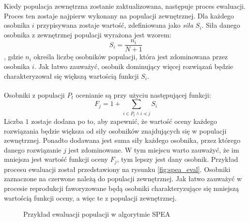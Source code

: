 \documentclass[twoside]{iisthesis}
\begin{document}
Kiedy populacja zewnętrzna zostanie zaktualizowana, następuje proces ewaluacji. Proces ten zostaje najpierw wykonany na populacji zewnętrznej. Dla każdego osobnika $i$ przypisywana zostaje wartość, zdefiniowana jako \textit{siła} $S_{i}$. Siła danego osobnika z zewnętrznej populacji wyrażona jest wzorem:
\begin{equation}\label{eq:str_ep}
	S_{i} = \dfrac{n_{i}}{N + 1}
\end{equation}
, gdzie $n_{i}$ określa liczbę osobników populacji, która jest zdominowana przez osobnika $i$. Jak łatwo zauważyć, osobnik dominujący więcej rozwiązań będzie charakteryzował się większą wartością funkcji $S_{i}$.\\\\
Osobniki z populacji $P_{t}$ ocenianie są przy użyciu następującej funkcji:
\begin{equation}\label{eq:str_p}
	F_{j} = 1 + \sum_{i \in \overline{P_{t}} \wedge i \preceq j} S_{i}
\end{equation}
Liczba $1$ zostaje dodana po to, aby zapewnić, że wartość oceny każdego rozwiązania będzie większa od siły osobników znajdujących się w populacji zewnętrznej. Ponadto dodawana jest suma siły każdego osobnika, przez którego danego rozwiązanie $j$ jest zdominowane. W tym miejscu warto zauważyć, że im mniejsza jest wartość funkcji oceny $F_{j}$, tym lepszy jest dany osobnik. Przykład procesu ewaluacji został przedstawiony na rysunku \eqref{fig:spea_eval}. Osobniki zaznaczone na czerwone należą do populacji zewnętrznej. Jak łatwo zauważyć w procesie reprodukcji faworyzowane będą osobniki charakteryzujące się mniejszą wartością funkcji oceny, a więc te z populacji zewnętrznej.
\begin{figure}[!htb]
	\centering
	\caption{Przykład ewaluacji populacji w algorytmie SPEA}
	\label{fig:spea_eval}
\end{figure}
\end{document}
